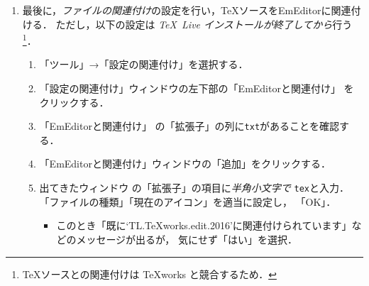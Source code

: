 \documentclass{ltjsarticle}
\begin{document}
\begin{enumerate}
\item 最後に，\emph{ファイルの関連付け}の設定を行い，\TeX ソースをEmEditorに関連付ける．
  ただし，以下の設定は \emph{\TeX~Live インストールが終了してから}行う\footnote{\TeX ソースとの関連付けは \TeX works と競合するため．}．
  \begin{enumerate}
  \item 「ツール」→「設定の関連付け」を選択する．%


  \item 「設定の関連付け」ウィンドウの左下部の「EmEditorと関連付け」
    をクリックする．%

  \item 「EmEditorと関連付け」%
    の「拡張子」の列に\texttt{txt}があることを確認する．

  \item 「EmEditorと関連付け」ウィンドウの「追加」をクリックする．

  \item 出てきたウィンドウ%
    の「拡張子」の項目に\emph{半角小文字で}
    \texttt{tex}と入力．「ファイルの種類」「現在のアイコン」を適当に設定し，
    「OK」．
    \begin{itemize}
    \item このとき「既に`TL.TeXworks.edit.2016'に関連付けられています」などのメッセージが出るが，
      気にせず「はい」を選択．
    \end{itemize}
  \end{enumerate}
\end{enumerate}
\end{document}
